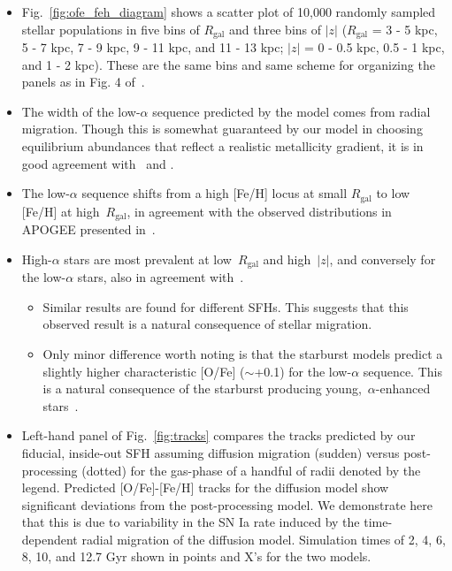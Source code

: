 \documentclass[fleqn, usenatbib]{mnras}
\begin{document}
\begin{itemize} 
	\item Fig.~\ref{fig:ofe_feh_diagram} shows a scatter plot of 10,000 
	randomly sampled stellar populations in five bins of $R_\text{gal}$ and 
	three bins of $\left|z\right|$ ($R_\text{gal}$ = 3 - 5 kpc, 5 - 7 kpc, 
	7 - 9 kpc, 9 - 11 kpc, and 11 - 13 kpc; $\left|z\right|$ = 0 - 0.5 kpc, 
	0.5 - 1 kpc, and 1 - 2 kpc). These are the same bins and same scheme for 
	organizing the panels as in Fig. 4 of~\citet{Hayden2015}. 

	\item The width of the low-$\alpha$ sequence predicted by the model comes 
	from radial migration. Though this is somewhat guaranteed by our model 
	in choosing equilibrium abundances that reflect a realistic metallicity 
	gradient, it is in good agreement with~\citet{Schoenrich2009} and 
	\citet{Nidever2014}. 

	\item The low-$\alpha$ sequence shifts from a high [Fe/H] locus at small 
	$R_\text{gal}$ to low [Fe/H] at high~$R_\text{gal}$, in agreement with the 
	observed distributions in APOGEE presented in~\citet{Hayden2015}. 

	\item High-$\alpha$ stars are most prevalent at low~$R_\text{gal}$ and 
	high~$\left|z\right|$, and conversely for the low-$\alpha$ stars, also 
	in agreement with~\citet{Hayden2015}. 
	\begin{itemize} 
		\item Similar results are found for different SFHs. This suggests that 
		this observed result is a natural consequence of stellar migration. 

		\item Only minor difference worth noting is that the starburst models 
		predict a slightly higher characteristic [O/Fe] ($\sim$+0.1) for the 
		low-$\alpha$ sequence. This is a natural consequence of the starburst 
		producing young,~$\alpha$-enhanced stars~\citep{Johnson2020}. 
	\end{itemize} 

	\item Left-hand panel of Fig.~\ref{fig:tracks} compares the tracks 
	predicted by our fiducial, inside-out SFH assuming diffusion migration 
	(sudden) versus post-processing (dotted) for the gas-phase of a handful of 
	radii denoted by the legend. Predicted [O/Fe]-[Fe/H] tracks for the 
	diffusion model show significant deviations from the post-processing 
	model. We demonstrate here that this is due to variability in the SN Ia 
	rate induced by the time-dependent radial migration of the diffusion 
	model. Simulation times of 2, 4, 6, 8, 10, and 12.7 Gyr shown in points 
	and X's for the two models. 


\end{itemize}
\end{document}
